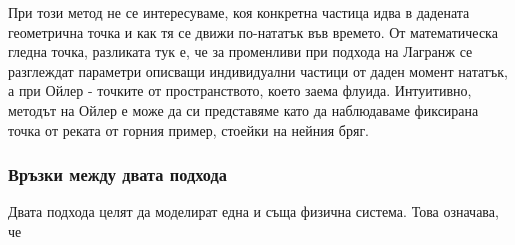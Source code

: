 При този метод не се интересуваме, коя конкретна частица идва в дадената геометрична точка и как тя се движи по-нататък във времето. От математическа гледна точка, разликата тук е, че за променливи при подхода на Лагранж се разглеждат параметри описващи индивидуални частици от даден момент нататък, а при Ойлер - точките от пространството, което
заема флуида.
Интуитивно, методът на Ойлер е може да си представяме като да наблюдаваме фиксирана точка от реката от горния пример, стоейки на нейния бряг.

\subsubsection{Връзки между двата подхода}
Двата подхода целят да моделират една и съща физична система. Това означава, че 
